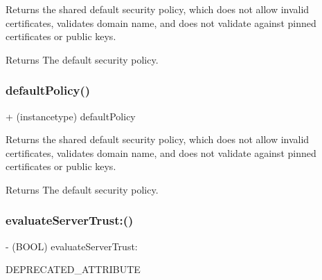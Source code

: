Returns the shared default security policy, which does not allow invalid certificates, validates domain name, and does not validate against pinned certificates or public keys.

\begin{DoxyReturn}{Returns}
The default security policy. 
\end{DoxyReturn}
\mbox{\label{interface_a_f_security_policy_aa63c18e904ef6e42761b7c20a1af2f3f}} 
\subsubsection{\texorpdfstring{default\+Policy()}{defaultPolicy()}\hspace{0.1cm}{\footnotesize\ttfamily [3/3]}}
{\footnotesize\ttfamily + (instancetype) default\+Policy \begin{DoxyParamCaption}{ }\end{DoxyParamCaption}}

Returns the shared default security policy, which does not allow invalid certificates, validates domain name, and does not validate against pinned certificates or public keys.

\begin{DoxyReturn}{Returns}
The default security policy. 
\end{DoxyReturn}
\mbox{\label{interface_a_f_security_policy_a404e83f245843cb7fd6408d5e9ee15e0}} 
\subsubsection{\texorpdfstring{evaluate\+Server\+Trust\+:()}{evaluateServerTrust:()}\hspace{0.1cm}{\footnotesize\ttfamily [1/3]}}
{\footnotesize\ttfamily -\/ (B\+O\+OL) evaluate\+Server\+Trust\+: \begin{DoxyParamCaption}\item[{(Sec\+Trust\+Ref)}]{D\+E\+P\+R\+E\+C\+A\+T\+E\+D\+\_\+\+A\+T\+T\+R\+I\+B\+U\+TE }\end{DoxyParamCaption}}

